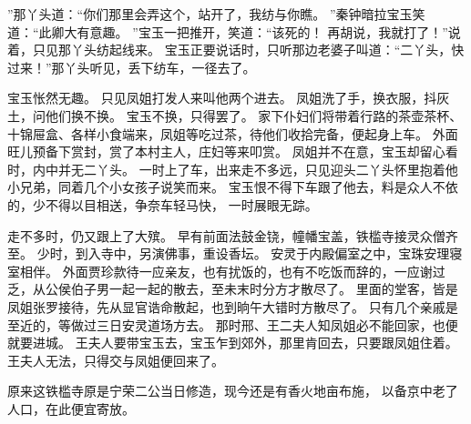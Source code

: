 ”那丫头道：“你们那里会弄这个，站开了，我纺与你瞧。
”秦钟暗拉宝玉笑道：“此卿大有意趣。
”宝玉一把推开，笑道：“该死的！
再胡说，我就打了！”说着，只见那丫头纺起线来。
宝玉正要说话时，只听那边老婆子叫道：“二丫头，快过来！”那丫头听见，丢下纺车，一径去了。
\par
宝玉怅然无趣。
只见凤姐打发人来叫他两个进去。
凤姐洗了手，换衣服，抖灰土，问他们换不换。
宝玉不换，只得罢了。
家下仆妇们将带着行路的茶壶茶杯、十锦屉盒、各样小食端来，凤姐等吃过茶，待他们收拾完备，便起身上车。
外面旺儿预备下赏封，赏了本村主人，庄妇等来叩赏。
凤姐并不在意，宝玉却留心看时，内中并无二丫头。
一时上了车，出来走不多远，只见迎头二丫头怀里抱着他小兄弟，同着几个小女孩子说笑而来。
宝玉恨不得下车跟了他去，料是众人不依的，少不得以目相送，争奈车轻马快，
一时展眼无踪。
\par
走不多时，仍又跟上了大殡。
早有前面法鼓金铙，幢幡宝盖，铁槛寺接灵众僧齐至。
少时，到入寺中，另演佛事，重设香坛。
安灵于内殿偏室之中，宝珠安理寝室相伴。
外面贾珍款待一应亲友，也有扰饭的，也有不吃饭而辞的，一应谢过乏，从公侯伯子男一起一起的散去，至未末时分方才散尽了。
里面的堂客，皆是凤姐张罗接待，先从显官诰命散起，也到晌午大错时方散尽了。
只有几个亲戚是至近的，等做过三日安灵道场方去。
那时邢、王二夫人知凤姐必不能回家，也便就要进城。
王夫人要带宝玉去，宝玉乍到郊外，那里肯回去，只要跟凤姐住着。
王夫人无法，只得交与凤姐便回来了。
\par
原来这铁槛寺原是宁荣二公当日修造，现今还是有香火地亩布施，
以备京中老了人口，在此便宜寄放。
